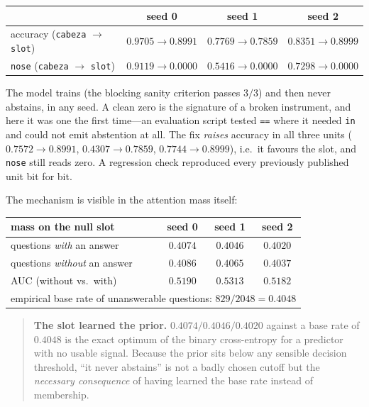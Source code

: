 \documentclass[11pt,a4paper]{article}
\begin{document}
\begin{center}
\begin{tabular}{lccc}
\toprule
 & seed 0 & seed 1 & seed 2 \\
\midrule
accuracy (\texttt{cabeza} $\rightarrow$ \texttt{slot}) & $0.9705 \rightarrow 0.8991$ & $0.7769 \rightarrow 0.7859$ & $0.8351 \rightarrow 0.8999$ \\
\texttt{nose} (\texttt{cabeza} $\rightarrow$ \texttt{slot}) & $0.9119 \rightarrow \mathbf{0.0000}$ & $0.5416 \rightarrow \mathbf{0.0000}$ & $0.7298 \rightarrow \mathbf{0.0000}$ \\
\bottomrule
\end{tabular}
\end{center}

The model trains (the blocking sanity criterion passes $3/3$) and then never abstains, in any seed.
A clean zero is the signature of a broken instrument, and here it was one the first
time---an evaluation script tested \texttt{==} where it needed \texttt{in} and could not emit
abstention at all. The fix \emph{raises} accuracy in all three units ($0.7572 \to 0.8991$,
$0.4307 \to 0.7859$, $0.7744 \to 0.8999$), i.e.\ it favours the slot, and \texttt{nose} still reads
zero. A regression check reproduced every previously published unit bit for bit.

The mechanism is visible in the attention mass itself:

\begin{center}
\begin{tabular}{lccc}
\toprule
mass on the null slot & seed 0 & seed 1 & seed 2 \\
\midrule
questions \emph{with} an answer & $0.4074$ & $0.4046$ & $0.4020$ \\
questions \emph{without} an answer & $0.4086$ & $0.4065$ & $0.4037$ \\
AUC (without vs.\ with) & $0.5190$ & $0.5313$ & $0.5182$ \\
\midrule
\multicolumn{4}{c}{empirical base rate of unanswerable questions: $829/2048 = \mathbf{0.4048}$}\\
\bottomrule
\end{tabular}
\end{center}

\begin{quote}
\textbf{The slot learned the prior.} $0.4074 / 0.4046 / 0.4020$ against a base rate of $0.4048$ is
the exact optimum of the binary cross-entropy for a predictor with no usable signal. Because the
prior sits below any sensible decision threshold, ``it never abstains'' is not a badly chosen cutoff
but the \emph{necessary consequence} of having learned the base rate instead of membership.
\end{quote}
\end{document}
